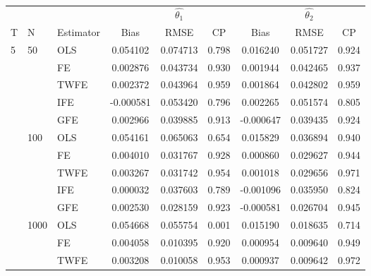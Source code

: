 \begin{tabular}{lll|ccc|ccc}
\toprule
   &      &        &              &  $\hat{\theta_1}$   &                &    & $\hat{\theta_2}$ & \\
T & N & Estimator &      Bias     &      RMSE     &   CP      &      Bias     &      RMSE     &   CP      \\
\midrule
5  & 50   & OLS  &  0.054102 &  0.074713 &                 0.798 &  0.016240 &  0.051727 &                 0.924 \\
   &      & FE  &  0.002876 &  0.043734 &                 0.930 &  0.001944 &  0.042465 &                 0.937 \\
   &      & TWFE  &  0.002372 &  0.043964 &                 0.959 &  0.001864 &  0.042802 &                 0.959 \\
   &      & IFE &  -0.000581 &  0.053420 &                 0.796 &  0.002265 &  0.051574 &                 0.805 \\
   &      & GFE  &  0.002966 &  0.039885 &                 0.913 & -0.000647 &  0.039435 &                 0.924 \\
   & 100  & OLS  &  0.054161 &  0.065063 &                 0.654 &  0.015829 &  0.036894 &                 0.940 \\
   &      & FE  &  0.004010 &  0.031767 &                 0.928 &  0.000860 &  0.029627 &                 0.944 \\
   &      & TWFE  &  0.003267 &  0.031742 &                 0.954 &  0.001018 &  0.029656 &                 0.971 \\
   &      & IFE  &  0.000032 &  0.037603 &                 0.789 &  -0.001096 &  0.035950 &                 0.824 \\
   &      & GFE  &  0.002530 &  0.028159 &                 0.923 & -0.000581 &  0.026704 &                 0.945 \\
   & 1000 & OLS  &  0.054668 &  0.055754 &                 0.001 &  0.015190 &  0.018635 &                 0.714 \\
   &      & FE  &  0.004058 &  0.010395 &                 0.920 &  0.000954 &  0.009640 &                 0.949 \\
   &      & TWFE  &  0.003208 &  0.010058 &                 0.953 &  0.000937 &  0.009642 &                 0.972 \\

\end{tabular}
